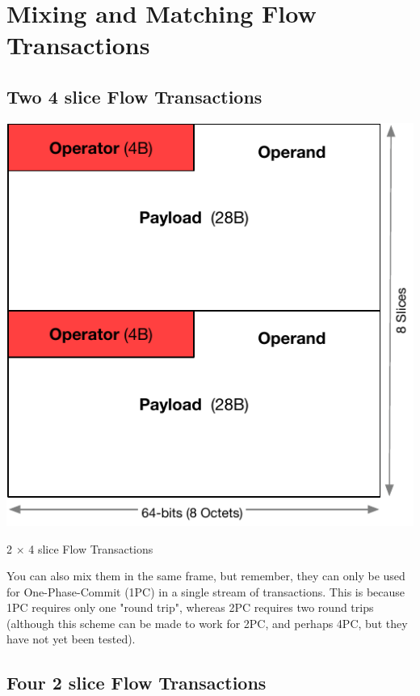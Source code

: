 \documentclass[../HFT-main.tex]{subfiles}
\begin{document}
\clearpage
\section{Mixing and Matching Flow Transactions}

\subsection{Two 4 slice Flow Transactions}

\begin{marginfigure}
        \includegraphics[width=\linewidth]{../figures/2-flow-subtransactions.pdf}
  \caption{2 $\times$ 4 slice Flow Transactions }
  \vspace{8pt}
\end{marginfigure}

You can also mix them in the same frame, but remember, they can only be used for One-Phase-Commit (1PC) in a single stream of transactions. This is because 1PC requires only one "round trip", whereas 2PC requires two round trips (although this scheme can be made to work for 2PC, and perhaps 4PC, but they have not yet been tested).

 
\subsection{Four  2 slice Flow Transactions}
\end{document}
